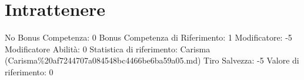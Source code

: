 \section{Intrattenere}\label{intrattenere}

\begin{description}
\tightlist
\item[Tags: ABI]
No Bonus Competenza: 0 Bonus Competenza di Riferimento: 1 Modificatore:
-5 Modificatore Abilità: 0 Statistica di riferimento: Carisma
(Carisma\%20af7244707a084548bc4466be6ba59a05.md) Tiro Salvezza: -5
Valore di riferimento: 0
\end{description}
